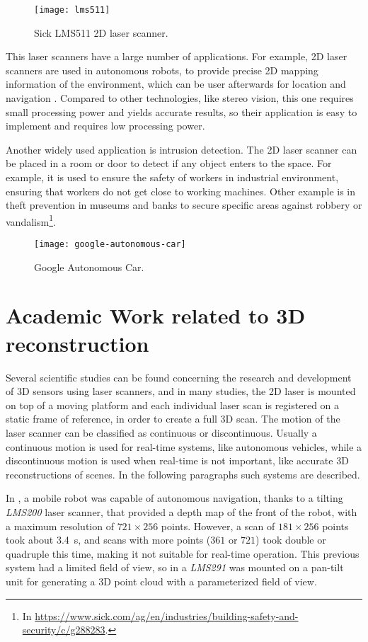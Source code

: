 \begin{figure}
    \centering
    \texttt{[image: lms511]}
    \caption{Sick LMS511 2D laser scanner.}
    \label{fig:sick-lms511}
\end{figure}

This laser scanners have a large number of applications. For example, 2D laser scanners are used in autonomous robots, to provide precise 2D mapping information of the environment, which can be user afterwards for location and navigation \cite{siritanawan17}. Compared to other technologies, like stereo vision, this one requires small processing power and yields accurate results, so their application is easy to implement and requires low processing power. 

Another widely used application is intrusion detection. The 2D laser scanner can be placed in a room or door to detect if any object enters to the space. For example, it is used to ensure the safety of workers in industrial environment, ensuring that workers do not get close to working machines. Other example is in theft prevention in museums and banks to secure specific areas against robbery or vandalism\footnote{In \url{https://www.sick.com/ag/en/industries/building-safety-and-security/c/g288283}.}.

\begin{figure}[h]
    \centering
    \texttt{[image: google-autonomous-car]}
    \caption{Google Autonomous Car.}
    \label{fig:google-autonomous-car}
\end{figure}

\section{Academic Work related to 3D reconstruction}

Several scientific studies can be found concerning the research and development of 3D sensors using laser scanners, and in many studies, the 2D laser is mounted on top of a moving platform and each individual laser scan is registered on a static frame of reference, in order to create a full 3D scan. The motion of the laser scanner can be classified as continuous or discontinuous. Usually a continuous motion is used for real-time systems, like autonomous vehicles, while a discontinuous motion is used when real-time is not important, like accurate 3D reconstructions of scenes. In the following paragraphs such systems are described.

In \cite{surmann03}, a mobile robot was capable of autonomous navigation, thanks to a tilting \textit{LMS200} laser scanner, that provided a depth map of the front of the robot, with a maximum resolution of $721\times256$ points. However, a scan of $181\times256$ points took about \SI{3.4}{\second}, and scans with more points ($361$ or $721$) took double or quadruple this time, making it not suitable for real-time operation. This previous system had a limited field of view, so in \cite{zcai05} a \textit{LMS291} was mounted on a pan-tilt unit for generating a 3D point cloud with a parameterized field of view.

